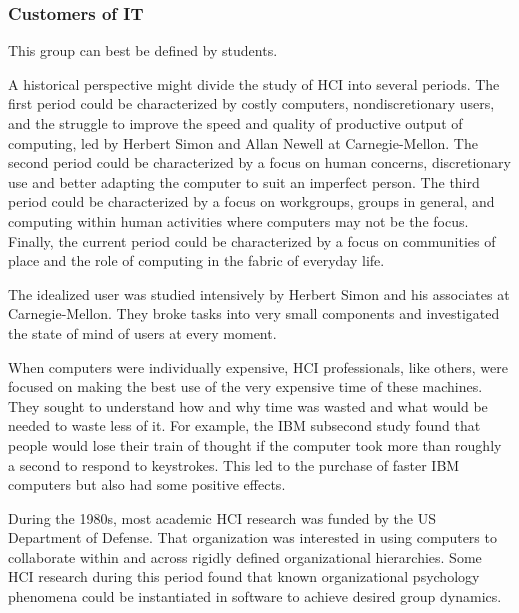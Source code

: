 \hypertarget{customers-of-it}{%
\subsubsection{Customers of IT}\label{customers-of-it}}

This group can best be defined by students.

\hypertarget{historical-perspective}{%
\label{historical-perspective}}

A historical perspective might divide the study of HCI into several
periods. The first period could be characterized by costly computers,
nondiscretionary users, and the struggle to improve the speed and
quality of productive output of computing, led by Herbert Simon and
Allan Newell at Carnegie-Mellon. The second period could be
characterized by a focus on human concerns, discretionary use and better
adapting the computer to suit an imperfect person. The third period
could be characterized by a focus on workgroups, groups in general, and
computing within human activities where computers may not be the focus.
Finally, the current period could be characterized by a focus on
communities of place and the role of computing in the fabric of everyday
life.

\hypertarget{idealized-user}{%
\label{idealized-user}}

The idealized user was studied intensively by Herbert Simon and his
associates at Carnegie-Mellon. They broke tasks into very small
components and investigated the state of mind of users at every moment.

\hypertarget{nondiscretionary-use}{%
\label{nondiscretionary-use}}

When computers were individually expensive, HCI professionals, like
others, were focused on making the best use of the very expensive time
of these machines. They sought to understand how and why time was wasted
and what would be needed to waste less of it. For example, the IBM
subsecond study found that people would lose their train of thought if
the computer took more than roughly a second to respond to keystrokes.
This led to the purchase of faster IBM computers but also had some
positive effects.

\hypertarget{hierarchical-collaboration}{%
\label{hierarchical-collaboration}}

During the 1980s, most academic HCI research was funded by the US
Department of Defense. That organization was interested in using
computers to collaborate within and across rigidly defined
organizational hierarchies. Some HCI research during this period found
that known organizational psychology phenomena could be instantiated in
software to achieve desired group dynamics.

